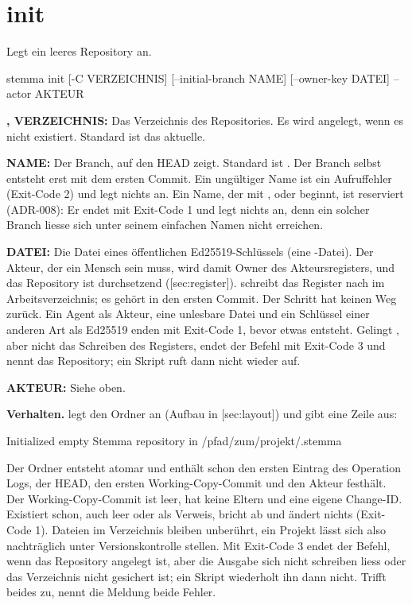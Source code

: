 \section{init}

Legt ein leeres Repository an.

\starttyping
stemma init [-C VERZEICHNIS] [--initial-branch NAME] [--owner-key DATEI] --actor AKTEUR
\stoptyping

\startitemize
\item {\bf {},  VERZEICHNIS:} Das Verzeichnis des Repositories.
Es wird angelegt, wenn es nicht existiert. Standard ist das aktuelle.
\item {\bf {} NAME:} Der Branch, auf den HEAD zeigt.
Standard ist . Der Branch selbst entsteht erst mit dem ersten Commit.
Ein ungültiger Name ist ein Aufruffehler (Exit-Code 2) und legt nichts an.
Ein Name, der mit ,  oder  beginnt, ist reserviert
(ADR-008): Er endet mit Exit-Code 1 und legt nichts an,
denn ein solcher Branch liesse sich unter seinem einfachen Namen nicht erreichen.
\item {\bf {} DATEI:} Die Datei eines öffentlichen Ed25519-Schlüssels
(eine -Datei). Der Akteur, der ein Mensch sein muss, wird damit Owner des
Akteursregisters, und das Repository ist durchsetzend ([sec:register]).
 schreibt das Register nach  im Arbeitsverzeichnis;
es gehört in den ersten Commit. Der Schritt hat keinen Weg zurück.
Ein Agent als Akteur, eine unlesbare Datei und ein Schlüssel einer anderen Art als Ed25519
enden mit Exit-Code 1, bevor etwas entsteht.
Gelingt , aber nicht das Schreiben des Registers, endet der Befehl mit Exit-Code 3
und nennt das Repository; ein Skript ruft  dann nicht wieder auf.
\item {\bf {} AKTEUR:} Siehe oben.
\stopitemize

{\bf Verhalten.}  legt den Ordner  an (Aufbau
in [sec:layout]) und gibt eine Zeile aus:

\starttyping
Initialized empty Stemma repository in /pfad/zum/projekt/.stemma
\stoptyping

Der Ordner entsteht atomar und enthält schon den ersten Eintrag des Operation Logs,
der HEAD, den ersten Working-Copy-Commit und den Akteur festhält.
Der Working-Copy-Commit ist leer, hat keine Eltern und eine eigene Change-ID.
Existiert  schon, auch leer oder als Verweis, bricht  ab
und ändert nichts (Exit-Code 1). Dateien im Verzeichnis bleiben unberührt,
ein Projekt lässt sich also nachträglich unter Versionskontrolle stellen.
Mit Exit-Code 3 endet der Befehl, wenn das Repository angelegt ist,
aber die Ausgabe sich nicht schreiben liess oder das Verzeichnis nicht gesichert ist;
ein Skript wiederholt ihn dann nicht.
Trifft beides zu, nennt die Meldung beide Fehler.

